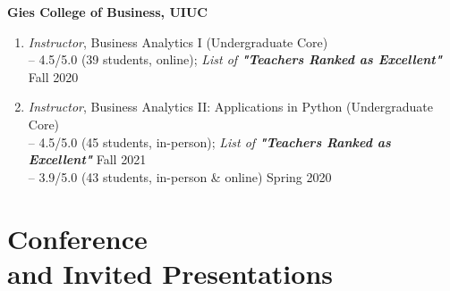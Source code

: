 \documentclass[margin,line]{resume}
\begin{document}
\begin{resume}
         \textbf{Gies College of Business, UIUC}
         \begin{enumerate}[topsep=1pt, leftmargin=*]
         \item {\sl Instructor}, Business Analytics I (Undergraduate Core)\\ [0.3em]
         -- 4.5/5.0 (39 students, online); \textit{List of \textbf{"Teachers Ranked as Excellent"} } \hfill Fall 2020
         \item {\sl Instructor}, Business Analytics II: Applications in Python (Undergraduate Core)\\[0.3em]
         -- 4.5/5.0 (45 students, in-person); \textit{List of \textbf{"Teachers Ranked as Excellent"} } \hfill Fall 2021\\
         -- 3.9/5.0 (43 students, in-person \& online)  \hfill Spring 2020
         \end{enumerate}

       
 	  \section{\mysidestyle Conference\\ and Invited Presentations} 
 	  
 	  \begin{enumerate}[topsep=0pt, leftmargin=*]
 	           

\end{enumerate}
\end{resume}
\end{document}
